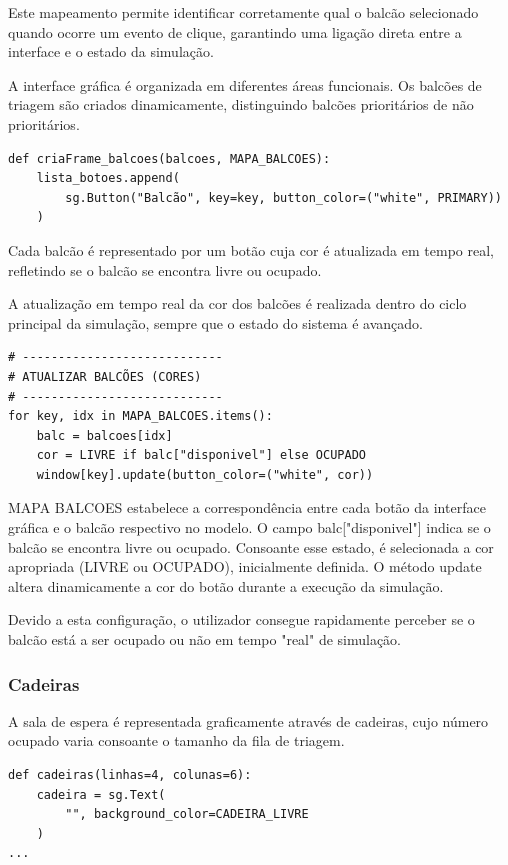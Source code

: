 \documentclass[12pt,a4paper]{article} %
\begin{document}
    Este mapeamento permite identificar corretamente qual o balcão selecionado quando ocorre um evento de clique, garantindo uma ligação direta entre a interface e o estado da simulação.

    \medskip
    A interface gráfica é organizada em diferentes áreas funcionais. Os balcões de triagem são criados dinamicamente, distinguindo balcões prioritários de não prioritários.

\begin{verbatim}
def criaFrame_balcoes(balcoes, MAPA_BALCOES):
    lista_botoes.append(
        sg.Button("Balcão", key=key, button_color=("white", PRIMARY))
    )
\end{verbatim}

    Cada balcão é representado por um botão cuja cor é atualizada em tempo real, refletindo se o balcão se encontra livre ou ocupado.

    A atualização em tempo real da cor dos balcões é realizada dentro do ciclo principal da simulação, sempre que o estado do sistema é avançado.

\begin{verbatim}
# ----------------------------
# ATUALIZAR BALCÕES (CORES)
# ----------------------------
for key, idx in MAPA_BALCOES.items():
    balc = balcoes[idx]
    cor = LIVRE if balc["disponivel"] else OCUPADO
    window[key].update(button_color=("white", cor))

\end{verbatim}

    MAPA BALCOES estabelece a correspondência entre cada botão da interface gráfica e o balcão respectivo no modelo. O campo balc["disponivel"] indica se o balcão se encontra livre ou ocupado. Consoante esse estado, é selecionada a cor apropriada (LIVRE ou OCUPADO), inicialmente definida. O método update altera dinamicamente a cor do botão durante a execução da simulação.

    Devido a esta configuração, o utilizador consegue rapidamente perceber se o balcão está a ser ocupado ou não em tempo "real" de simulação. 

\subsubsection{Cadeiras}
\medskip
A sala de espera é representada graficamente através de cadeiras, cujo número ocupado varia consoante o tamanho da fila de triagem.

\begin{verbatim}
def cadeiras(linhas=4, colunas=6):
    cadeira = sg.Text(
        "", background_color=CADEIRA_LIVRE
    )
...
\end{verbatim}
\end{document}
